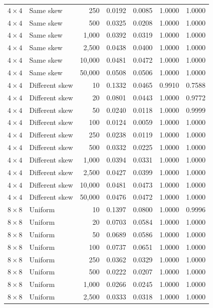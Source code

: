 \begin{longtable}{@{}llrrrrr@{}}
\(4\times4\) & Same skew & 250 & 0.0192 & 0.0085 & 1.0000 & 1.0000\\
\(4\times4\) & Same skew & 500 & 0.0325 & 0.0208 & 1.0000 & 1.0000\\
\(4\times4\) & Same skew & 1,000 & 0.0392 & 0.0319 & 1.0000 & 1.0000\\
\(4\times4\) & Same skew & 2,500 & 0.0438 & 0.0400 & 1.0000 & 1.0000\\
\(4\times4\) & Same skew & 10,000 & 0.0481 & 0.0472 & 1.0000 & 1.0000\\
\(4\times4\) & Same skew & 50,000 & 0.0508 & 0.0506 & 1.0000 & 1.0000\\
\(4\times4\) & Different skew & 10 & 0.1332 & 0.0465 & 0.9910 & 0.7588\\
\(4\times4\) & Different skew & 20 & 0.0801 & 0.0443 & 1.0000 & 0.9772\\
\(4\times4\) & Different skew & 50 & 0.0240 & 0.0118 & 1.0000 & 0.9999\\
\(4\times4\) & Different skew & 100 & 0.0124 & 0.0059 & 1.0000 & 1.0000\\
\(4\times4\) & Different skew & 250 & 0.0238 & 0.0119 & 1.0000 & 1.0000\\
\(4\times4\) & Different skew & 500 & 0.0332 & 0.0225 & 1.0000 & 1.0000\\
\(4\times4\) & Different skew & 1,000 & 0.0394 & 0.0331 & 1.0000 & 1.0000\\
\(4\times4\) & Different skew & 2,500 & 0.0427 & 0.0399 & 1.0000 & 1.0000\\
\(4\times4\) & Different skew & 10,000 & 0.0481 & 0.0473 & 1.0000 & 1.0000\\
\(4\times4\) & Different skew & 50,000 & 0.0476 & 0.0472 & 1.0000 & 1.0000\\
\midrule
\(8\times8\) & Uniform & 10 & 0.1397 & 0.0800 & 1.0000 & 0.9996\\
\(8\times8\) & Uniform & 20 & 0.0703 & 0.0584 & 1.0000 & 1.0000\\
\(8\times8\) & Uniform & 50 & 0.0689 & 0.0586 & 1.0000 & 1.0000\\
\(8\times8\) & Uniform & 100 & 0.0737 & 0.0651 & 1.0000 & 1.0000\\
\(8\times8\) & Uniform & 250 & 0.0362 & 0.0329 & 1.0000 & 1.0000\\
\(8\times8\) & Uniform & 500 & 0.0222 & 0.0207 & 1.0000 & 1.0000\\
\(8\times8\) & Uniform & 1,000 & 0.0266 & 0.0245 & 1.0000 & 1.0000\\
\(8\times8\) & Uniform & 2,500 & 0.0333 & 0.0318 & 1.0000 & 1.0000\\

\end{longtable}
